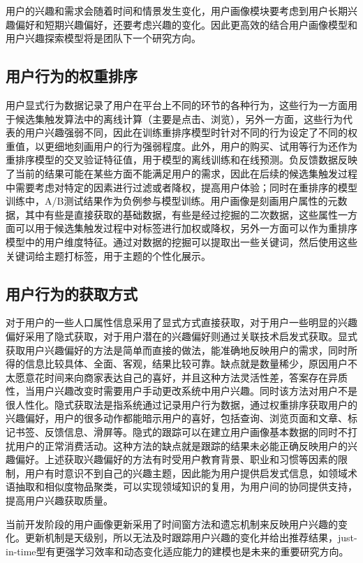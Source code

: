   用户的兴趣和需求会随着时间和情景发生变化，用户画像模块要考虑到用户长期兴趣偏好和短期兴趣偏好，还要考虑兴趣的变化。因此更高效的结合用户画像模型和用户兴趣探索模型将是团队下一个研究方向。

  \subsection{用户行为的权重排序}
  用户显式行为数据记录了用户在平台上不同的环节的各种行为，这些行为一方面用于候选集触发算法中的离线计算（主要是点击、浏览），另外一方面，这些行为代表的用户兴趣强弱不同，因此在训练重排序模型时针对不同的行为设定了不同的权重值，以更细地刻画用户的行为强弱程度。此外，用户的购买、试用等行为还作为重排序模型的交叉验证特征值，用于模型的离线训练和在线预测。负反馈数据反映了当前的结果可能在某些方面不能满足用户的需求，因此在后续的候选集触发过程中需要考虑对特定的因素进行过滤或者降权，提高用户体验；同时在重排序的模型训练中，A/B测试结果\citep{ab-test}作为负例参与模型训练。用户画像是刻画用户属性的元数据，其中有些是直接获取的基础数据，有些是经过挖掘的二次数据，这些属性一方面可以用于候选集触发过程中对标签进行加权或降权，另外一方面可以作为重排序模型中的用户维度特征。通过对数据的挖掘可以提取出一些关键词，然后使用这些关键词给主题打标签，用于主题的个性化展示。

  \subsection{用户行为的获取方式}
  对于用户的一些人口属性信息采用了显式方式直接获取，对于用户一些明显的兴趣偏好采用了隐式获取，对于用户潜在的兴趣偏好则通过关联技术启发式获取。显式获取用户兴趣偏好的方法是简单而直接的做法，能准确地反映用户的需求，同时所得的信息比较具体、全面、客观，结果比较可靠。缺点就是数量稀少，原因用户不太愿意花时间来向商家表达自己的喜好，并且这种方法灵活性差，答案存在异质性，当用户兴趣改变时需要用户手动更改系统中用户兴趣。同时该方法对用户不是很人性化。隐式获取法是指系统通过记录用户行为数据，通过权重排序获取用户的兴趣偏好，用户的很多动作都能暗示用户的喜好，包括查询、浏览页面和文章、标记书签、反馈信息、滑屏等。隐式的跟踪可以在建立用户画像基本数据的同时不打扰用户的正常消费活动。这种方法的缺点就是跟踪的结果未必能正确反映用户的兴趣偏好。上述获取兴趣偏好的方法有时受用户教育背景、职业和习惯等因素的限制，用户有时意识不到自己的兴趣主题，因此能为用户提供启发式信息，如领域术语抽取和相似度物品聚类，可以实现领域知识的复用，为用户间的协同提供支持，提高用户兴趣获取质量。

  当前开发阶段的用户画像更新采用了时间窗方法和遗忘机制来反映用户兴趣的变化。更新机制是天级别，所以无法及时跟踪用户兴趣的变化并给出推荐结果，just-in-time型有更强学习效率和动态变化适应能力的建模也是未来的重要研究方向。 

